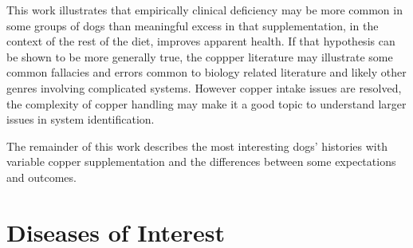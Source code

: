 \documentclass[aps,secnumarabic,balancelastpage,amsmath,amssymb,nofootinbib]{revtex4}
\newcommand{\mjmtolx}[1]{}
\begin{document}
This work illustrates that empirically clinical deficiency
may be more common in some groups of dogs than meaningful excess
in that supplementation, in the context of the rest of the 
diet,  improves apparent health.
If that hypothesis can be shown to be more generally
true, the coppper literature may illustrate some common
fallacies and errors common to biology related
literature and likely other genres involving complicated
systems. 
However copper intake issues are resolved, the complexity of
copper handling may make it a good topic to understand larger
issues in system identification. 

\mjmtolx{
However, the empirical data and known theory or
biological pathways don't estalish a causal role
for excessive intake of copper as a problem in most cases.
Rather, other nutrients may be lacking to properly
deploy existing copper reources and likely other
things. In the particular case of copper accumulation
in the liver, its important to note that import and
export are controlled by different things. 
While import appears to be controlled by diet and
remote signals from the heart and binding
to albumin, export may be
limited by ceruloplasmin and excretion.


This work describes in more detail the theoretical and empirical
motivation to consider copper supplementation carefully
as part of a lrger supplementation progam. 


}



The remainder of this work describes the
most interesting dogs' histories  %
 with variable  copper supplementation  and the  
differences between some expectations and outcomes.  


\section{  Diseases of Interest }
\end{document}
